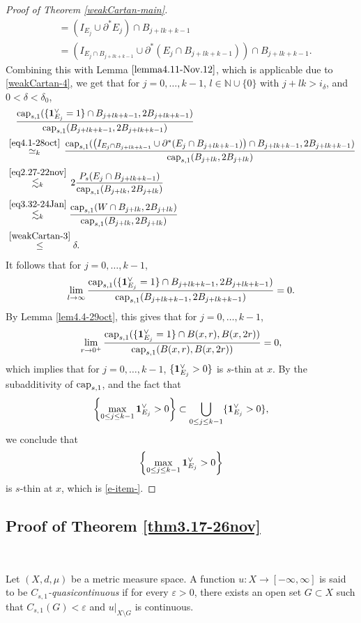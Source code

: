 \documentclass[11pt,leqno]{amsart}
\numberwithin{equation}{section}
\theoremstyle{definition}
\DeclareMathOperator{\capp}{cap}
\newcommand{\caps}{\capp_{s,1}}
\begin{document}
\begin{proof}[Proof of Theorem \ref{weakCartan-main}]
\begin{align*}
			&= (I_{E_j}\cup \partial^*E_j)\cap B_{j+lk+k-1}\\
			&= \left(I_{E_j\cap B_{j+lk+k-1}}\cup \partial^*(E_j\cap B_{j+lk+k-1}) \right)\cap B_{j+lk+k-1}.
		\end{align*}
		Combining this with Lemma $\ref{lemma4.11-Nov.12}$, which is applicable due to
		\eqref{weakCartan-4}, we get that for $j=0,\ldots,k-1$, $l\in\mathbb N\cup\{0\}$ with  $j+lk>i_\delta$, and $0<\delta<\delta_0$,
		\begin{align*}
			&\quad  \frac{\caps(\{{\bf 1}_{E_j}^\vee =1\}\cap B_{j+lk+k-1}, 2B_{j+lk+k-1})}{\caps(B_{j+lk+k-1},2B_{j+lk+k-1})}\\
			&\overset{\eqref{eq4.1-28oct}}{\simeq_k}\, \frac{\caps(\left(I_{E_j\cap B_{j+lk+k-1}}\cup \partial^*(E_j\cap B_{j+lk+k-1}) \right)\cap B_{j+lk+k-1}, 2B_{j+lk+k-1})}{\caps(B_{j+lk},2B_{j+lk})}\\
			&\overset{\eqref{eq2.27-22nov}}{\lesssim_k}  \, 2\frac{P_s(E_j\cap B_{j+lk+k-1})} {\caps(B_{j+lk},2B_{j+lk})}\\
			& \overset{\eqref{eq3.32-24Jan}}{\lesssim_k}   \frac{{\rm cap}_{s,1}(W\cap B_{j+lk}, 2B_{j+lk})}{\caps(B_{j+lk},2B_{j+lk})}\\
			&\overset{ \eqref{weakCartan-3}}{\leq}\delta.
		\end{align*}
		It follows that for $j=0,\ldots,k-1$,
		\[
		\lim_{l\to\infty}  \frac{\caps(\{{\bf 1}_{E_j}^\vee =1\}\cap B_{j+lk+k-1}, 2B_{j+lk+k-1})}{\caps(B_{j+lk+k-1},2B_{j+lk+k-1})}=0.
		\]
		By Lemma \ref{lem4.4-29oct}, this gives that for $j=0,\ldots,k-1$,
		\[
		\lim_{r\to 0^+} \frac{\caps(\{{\bf 1}_{E_j}^\vee =1\}
			\cap B(x,r), B(x,2r))}{\caps(B(x,r),B(x,2r))}=0,
		\]
		which implies that for $j=0,\ldots,k-1$, $\{ {\bf 1}_{E_j}^\vee>0\}$ is $s$-thin at $x$.
		By the subadditivity of ${\rm cap}_{s,1}$, and the fact that $$\left\{\max_{0\leq j\leq k-1} {\bf 1}_{E_j}^\vee >0\right\}\subset \bigcup_{0\leq j\leq k-1}\{ {\bf 1}_{E_j}^\vee>0 \},$$
		we conclude that
		\[
		\left\{\max_{0\leq j\leq k-1} {\bf 1}_{E_j}^\vee >0\right\}
		\]
		is $s$-thin at $x$, which is \ref{e-item-}.
	\end{proof}
	
	\subsection{Proof of Theorem \ref{thm3.17-26nov}}\ 
	
	
	
	Let $(X,d,\mu)$ be a metric measure space.
	A function $u:X\to[-\infty,\infty]$ is said to
	be \emph{$C_{s,1}$-quasicontinuous} if for every $\varepsilon>0$, there exists an open set
	$G\subset X$ such that $C_{s,1}(G)<\varepsilon$ and $u|_{X\setminus G}$ is continuous. 
	
\end{document}
